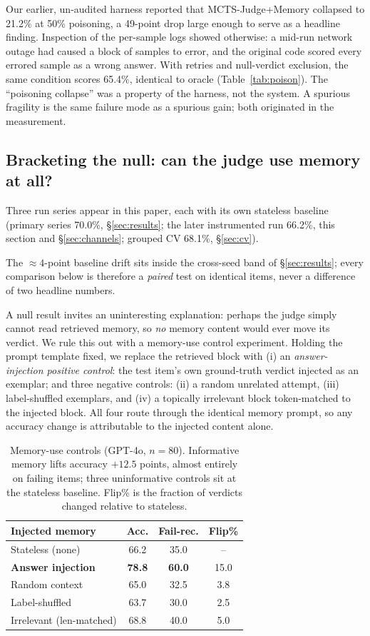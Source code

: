 \documentclass[]{ceurart}
\begin{document}
Our earlier, un-audited harness reported that MCTS-Judge+Memory collapsed to 21.2\% at 50\% poisoning, a 49-point drop large enough to serve as a headline finding. Inspection of the per-sample logs showed otherwise: a mid-run network outage had caused a block of samples to error, and the original code scored every errored sample as a wrong answer. With retries and null-verdict exclusion, the same condition scores 65.4\%, identical to oracle (Table~\ref{tab:poison}). The ``poisoning collapse'' was a property of the harness, not the system. A spurious fragility is the same failure mode as a spurious gain; both originated in the measurement.

\subsection{Bracketing the null: can the judge use memory at all?}
\label{sec:controls}

Three run series appear in this paper, each with its own stateless baseline (primary series 70.0\%, \S\ref{sec:results}; the later instrumented run 66.2\%, this section and \S\ref{sec:channels}; grouped CV 68.1\%, \S\ref{sec:cv}).

The $\approx4$-point baseline drift sits inside the cross-seed band of \S\ref{sec:results}; every comparison below is therefore a \emph{paired} test on identical items, never a difference of two headline numbers.

A null result invites an uninteresting explanation: perhaps the judge simply cannot read retrieved memory, so \emph{no} memory content would ever move its verdict. We rule this out with a memory-use control experiment. Holding the prompt template fixed, we replace the retrieved block with (i) an \emph{answer-injection positive control}: the test item's own ground-truth verdict injected as an exemplar; and three negative controls: (ii) a random unrelated attempt, (iii) label-shuffled exemplars, and (iv) a topically irrelevant block token-matched to the injected block. All four route through the identical memory prompt, so any accuracy change is attributable to the injected content alone.

\begin{table}[t]
\centering
\small
\caption{Memory-use controls (GPT-4o, $n{=}80$). Informative memory lifts accuracy $+12.5$ points, almost entirely on failing items; three uninformative controls sit at the stateless baseline. Flip\% is the fraction of verdicts changed relative to stateless.}
\label{tab:controls}
\begin{tabular}{lccc}
\toprule
Injected memory & Acc. & Fail-rec. & Flip\% \\
\midrule
Stateless (none) & 66.2 & 35.0 & -- \\
\textbf{Answer injection} & \textbf{78.8} & \textbf{60.0} & 15.0 \\
Random context & 65.0 & 32.5 & 3.8 \\
Label-shuffled & 63.7 & 30.0 & 2.5 \\
Irrelevant (len-matched) & 68.8 & 40.0 & 5.0 \\
\bottomrule
\end{tabular}

\end{table}
\end{document}
